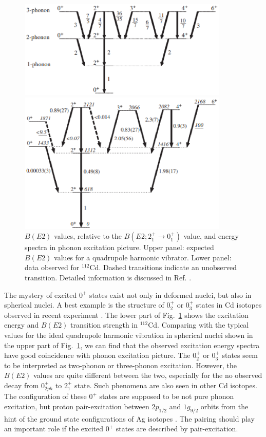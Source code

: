 \documentclass[11pt]{book} %
\begin{document}
\begin{figure}[tb]
 \begin{center}
    \includegraphics[width=100mm]{images/phonon.eps}
 \end{center}
 \begin{center}
    \includegraphics[width=100mm]{images/112Cd.eps}
 \end{center}
  \caption{$B(E2)$ values, relative to the $B(E2; 2_1^+\to 0_1^+)$ value, and energy spectra in phonon excitation picture. Upper panel: expected $B(E2)$ values for a quadrupole harmonic vibrator. Lower panel: data observed for ${}^{112}$Cd. Dashed transitions indicate an unobserved transition. Detailed information is discussed in Ref. \cite{GW10}.}
  \label{112Cd}
\end{figure}
The mystery of excited $0^+$ states exist not only in deformed nuclei, but also in spherical nuclei. A best example is the structure of $0_2^+$ or $0_3^+$ states in Cd isotopes observed in recent experiment \cite{GW10}. The lower part of Fig.~\ref{112Cd} shows the excitation energy and $B(E2)$ transition strength in ${}^{112}$Cd. Comparing with the typical values for the ideal quadrupole harmonic vibration in spherical nuclei shown in the upper part of Fig.~\ref{112Cd}, we can find that the observed excitation energy spectra have good coincidence with phonon excitation picture. The $0_2^+$ or $0_3^+$ states seem to be interpreted as two-phonon or three-phonon excitation. However, the $B(E2)$ values are quite different between the two, especially for the no observed decay from $0_{2ph}^+$ to $2_1^+$ state. Such phenomena are also seen in other Cd isotopes. The configuration of these $0^+$ states are supposed to be not pure phonon excitation, but proton pair-excitation between $2p_{1/2}$ and $1g_{9/2}$ orbits from the hint of the ground state configurations of Ag isotopes \cite{HW11}. The pairing should play an important role if the excited $0^+$ states are described by pair-excitation.
\end{document}
